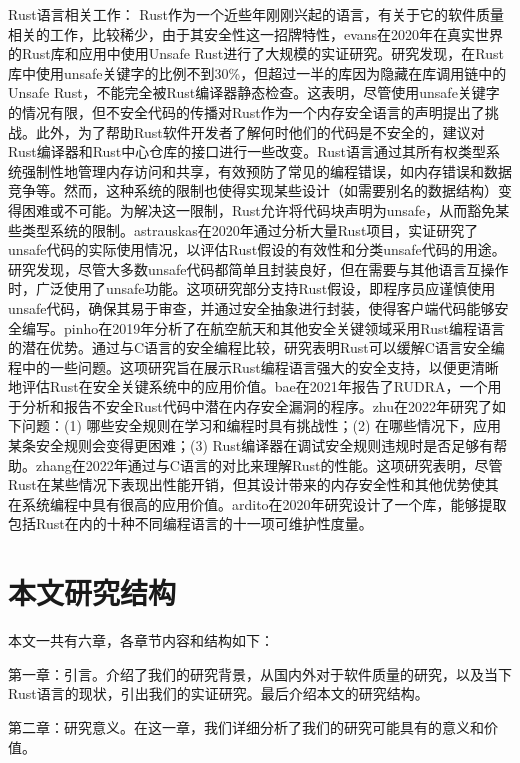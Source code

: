 Rust语言相关工作：
Rust作为一个近些年刚刚兴起的语言，有关于它的软件质量相关的工作，比较稀少，由于其安全性这一招牌特性，evans在2020年\cite{evans2020rust}在真实世界的Rust库和应用中使用Unsafe Rust进行了大规模的实证研究。研究发现，在Rust库中使用unsafe关键字的比例不到30\%，但超过一半的库因为隐藏在库调用链中的Unsafe Rust，不能完全被Rust编译器静态检查。这表明，尽管使用unsafe关键字的情况有限，但不安全代码的传播对Rust作为一个内存安全语言的声明提出了挑战。此外，为了帮助Rust软件开发者了解何时他们的代码是不安全的，建议对Rust编译器和Rust中心仓库的接口进行一些改变。Rust语言通过其所有权类型系统强制性地管理内存访问和共享，有效预防了常见的编程错误，如内存错误和数据竞争等。然而，这种系统的限制也使得实现某些设计（如需要别名的数据结构）变得困难或不可能。为解决这一限制，Rust允许将代码块声明为unsafe，从而豁免某些类型系统的限制。astrauskas在2020年\cite{astrauskas2020programmers}通过分析大量Rust项目，实证研究了unsafe代码的实际使用情况，以评估Rust假设的有效性和分类unsafe代码的用途。研究发现，尽管大多数unsafe代码都简单且封装良好，但在需要与其他语言互操作时，广泛使用了unsafe功能。这项研究部分支持Rust假设，即程序员应谨慎使用unsafe代码，确保其易于审查，并通过安全抽象进行封装，使得客户端代码能够安全编写。pinho在2019年\cite{pinho2019towards}分析了在航空航天和其他安全关键领域采用Rust编程语言的潜在优势。通过与C语言的安全编程比较，研究表明Rust可以缓解C语言安全编程中的一些问题。这项研究旨在展示Rust编程语言强大的安全支持，以便更清晰地评估Rust在安全关键系统中的应用价值。bae在2021年\cite{bae2021rudra}报告了RUDRA，一个用于分析和报告不安全Rust代码中潜在内存安全漏洞的程序。zhu在2022年\cite{zhu2022learning}研究了如下问题：(1) 哪些安全规则在学习和编程时具有挑战性；(2) 在哪些情况下，应用某条安全规则会变得更困难；(3) Rust编译器在调试安全规则违规时是否足够有帮助。zhang在2022年\cite{zhang2022towards}通过与C语言的对比来理解Rust的性能。这项研究表明，尽管Rust在某些情况下表现出性能开销，但其设计带来的内存安全性和其他优势使其在系统编程中具有很高的应用价值。ardito在2020年\cite{ardito2020rust}研究设计了一个库，能够提取包括Rust在内的十种不同编程语言的十一项可维护性度量。


\section{本文研究结构}
本文一共有六章，各章节内容和结构如下：

第一章：引言。介绍了我们的研究背景，从国内外对于软件质量的研究，以及当下Rust语言的现状，引出我们的实证研究。最后介绍本文的研究结构。

第二章：研究意义。在这一章，我们详细分析了我们的研究可能具有的意义和价值。


